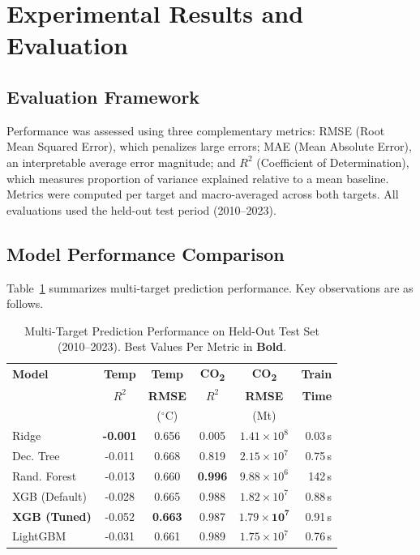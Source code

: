 \documentclass[conference]{IEEEtran}
\begin{document}
\section{Experimental Results and Evaluation}

\subsection{Evaluation Framework}

Performance was assessed using three complementary metrics: RMSE (Root Mean
Squared Error), which penalizes large errors; MAE (Mean Absolute Error), an
interpretable average error magnitude; and $R^2$ (Coefficient of
Determination), which measures proportion of variance explained relative to a
mean baseline. Metrics were computed per target and macro-averaged across both
targets. All evaluations used the held-out test period (2010--2023).

\subsection{Model Performance Comparison}

Table~\ref{tab:results} summarizes multi-target prediction performance. Key
observations are as follows.

\begin{table}[htbp]
    \caption{Multi-Target Prediction Performance on Held-Out Test Set
    (2010--2023). Best Values Per Metric in \textbf{Bold}.}
    \label{tab:results}
    \centering
    \scriptsize
    \begin{tabular}{lccccr}
        \toprule
        \textbf{Model} & \textbf{Temp} & \textbf{Temp} & \textbf{CO\textsubscript{2}} & \textbf{CO\textsubscript{2}} & \textbf{Train} \\
        & \textbf{$R^2$} & \textbf{RMSE} & \textbf{$R^2$} & \textbf{RMSE} & \textbf{Time} \\
        & & ($^\circ$C) & & (Mt) & \\
        \midrule
        Ridge            & \textbf{-0.001} & 0.656 & 0.005 & $1.41{\times}10^8$ & 0.03\,s \\
        Dec. Tree        & -0.011 & 0.668 & 0.819 & $2.15{\times}10^7$ & 0.75\,s \\
        Rand. Forest     & -0.013 & 0.660 & \textbf{0.996} & $9.88{\times}10^6$ & 142\,s \\
        XGB (Default)    & -0.028 & 0.665 & 0.988 & $1.82{\times}10^7$ & 0.88\,s \\
        \textbf{XGB (Tuned)} & -0.052 & \textbf{0.663} & 0.987 & $\mathbf{1.79{\times}10^7}$ & 0.91\,s \\
        LightGBM         & -0.031 & 0.661 & 0.989 & $1.75{\times}10^7$ & 0.76\,s \\
        \bottomrule
    \end{tabular}
\end{table}
\end{document}
